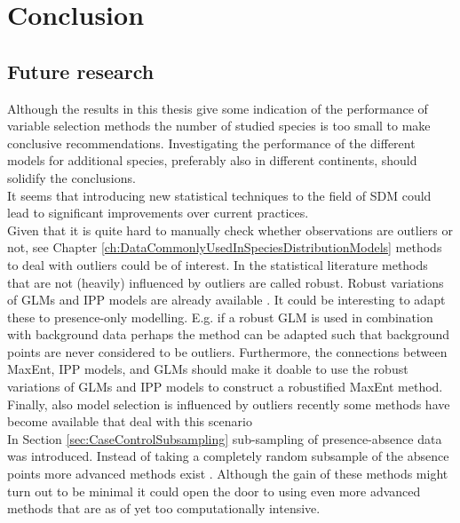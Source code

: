 \chapter{Conclusion}
\label{ch:Conclussion}
\section{}

\section{Future research}
Although the results in this thesis give some indication of the performance of variable selection methods the number of studied species is too small to make conclusive recommendations. Investigating the performance of the different models for additional species, preferably also in different continents, should solidify the conclusions.\\

It seems that introducing new statistical techniques to the field of SDM could lead to significant improvements over current practices. \\

Given that it is quite hard to manually check whether observations are outliers or not, see Chapter \ref{ch:DataCommonlyUsedInSpeciesDistributionModels} methods to deal with outliers could be of interest. In the statistical literature methods that are not (heavily) influenced by outliers are called robust. Robust variations of GLMs and IPP models are already available \parencite{cantoni_robust_2001, assuncao_robustness_1999}. It could be interesting to adapt these to presence-only modelling. E.g. if a robust GLM is used in combination with background data perhaps the method can be adapted such that background points are never considered to be outliers. Furthermore, the connections between MaxEnt, IPP models, and GLMs should make it doable to use the robust variations of GLMs and IPP models to construct a robustified MaxEnt method. Finally, also model selection is influenced by outliers recently some methods have become available that deal with this scenario \parencite[e.g.][]{muller_robust_2009} \\

In Section \ref{sec:CaseControlSubsampling} sub-sampling of presence-absence data was introduced. Instead of taking a completely random subsample of the absence points more advanced methods exist \parencite{king_logistic_2001}. Although the gain of these methods might turn out to be minimal it could open the door to using even more advanced methods that are as of yet too computationally intensive. \\

